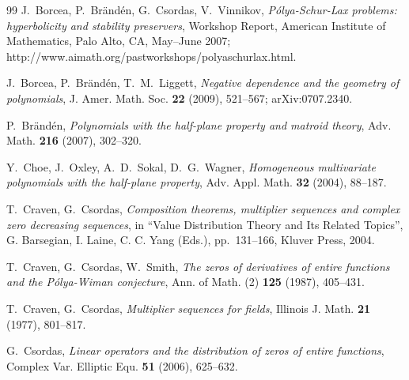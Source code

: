 \documentclass[10pt,reqno]{amsart}
\theoremstyle{plain}
\theoremstyle{definition}
\theoremstyle{remark}
\numberwithin{equation}{section}
\begin{document}
\begin{thebibliography}{99}
J.~Borcea, P.~Br\"and\'en, G.~Csordas, V.~Vinnikov, {\em P\'olya-Schur-Lax 
problems: hyperbolicity and stability preservers}, Workshop Report, 
American Institute of Mathematics, Palo Alto, 
CA, May--June 2007; http://www.aimath.org/pastworkshops/polyaschurlax.html.

J.~Borcea, P.~Br\"and\'en, T.~M.~Liggett, {\em Negative dependence and the 
geometry of polynomials}, J. Amer. Math. Soc. {\bf 22} (2009), 521--567; 
arXiv:0707.2340.



 P.~Br\"and\'en, {\em Polynomials with the half-plane property and matroid 
theory}, Adv. Math. {\bf 216} (2007), 302--320.




Y.~Choe, J.~Oxley, A.~D.~Sokal, D.~G.~Wagner, {\em Homogeneous multivariate 
polynomials with the half-plane property}, 
Adv. Appl. Math. {\bf 32} (2004), 88--187.

T.~Craven, G.~Csordas,
{\em Composition theorems, multiplier sequences and complex zero
decreasing sequences},  in  ``Value Distribution Theory
and Its Related Topics'', G. Barsegian, I. Laine, 
C. C. Yang (Eds.), pp.~131--166, Kluver Press, 2004.

T.~Craven, G.~Csordas, W.~Smith, 
{\em The zeros of derivatives of entire functions and the P\'olya-Wiman 
conjecture}, Ann. of Math. (2) {\bf 125} (1987), 405--431.

T.~Craven, G.~Csordas,
{\em Multiplier sequences for fields}, Illinois J. Math. {\bf 21} (1977), 
801--817. 

G.~Csordas, {\em Linear operators and the distribution of zeros of entire 
functions}, Complex Var. Elliptic Equ. {\bf 51} (2006), 625--632.


\end{thebibliography}
\end{document}
